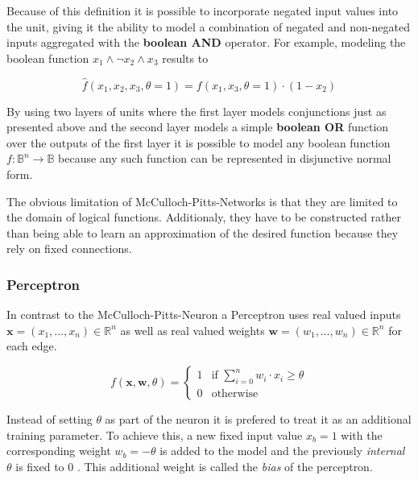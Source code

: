 Because of this definition it is possible to incorporate negated input values into the unit, giving it the ability to model a combination of negated and non-negated inputs aggregated with the \textbf{boolean AND} operator.
For example, modeling the boolean function $x_1 \wedge \neg x_2 \wedge x_3$ results to 

\begin{equation}
    \hat{f}(x_1, x_2, x_3, \theta=1) = f(x_1, x_3, \theta=1) \cdot (1 - x_2)
\end{equation}

By using two layers of units where the first layer models conjunctions just as presented above and the second layer models a simple \textbf{boolean OR} function over the outputs of the first layer it is possible to model any boolean function $f: \mathbb{B}^n \to \mathbb{B}$ because any such function can be represented in disjunctive normal form.

The obvious limitation of McCulloch-Pitts-Networks is that they are limited to the domain of logical functions.
Additionaly, they have to be constructed rather than being able to learn an approximation of the desired function because they rely on fixed connections.



\subsubsection{Perceptron}

In contrast to the McCulloch-Pitts-Neuron a Perceptron uses real valued inputs $\bm{x} = (x_1, \dots, x_n) \in \mathbb{R}^n$ as well as real valued weights $\bm{w} = (w_1, \dots, w_n) \in \mathbb{R}^n$ for each edge.

\begin{equation}
    f(\bm{x}, \bm{w}, \theta) = 
    \begin{cases}
        1 & \text{if } \sum_{i=0}^n w_i \cdot x_i \geq \theta \\
        0 & \text{otherwise}
    \end{cases}    
\end{equation}

Instead of setting $\theta$ as part of the neuron it is prefered to treat it as an additional training parameter.
To achieve this, a new fixed input value $x_b = 1$ with the corresponding weight $w_b = -\theta$ is added to the model and the previously \emph{internal} $\theta$ is fixed to $0$ .
This additional weight is called the \textit{bias} of the perceptron.

